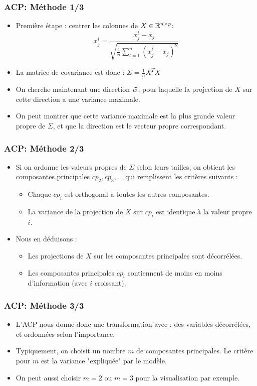 \begin{frame}
\frametitle{ACP: Méthode 1/3}
  \begin{itemize}
  	\item Première étape : centrer les colonnes de $X \in {\mathbb R}^{n \times p}$: 
 \begin{equation*}
 x^i_j = \frac{x_j^i - \overline{x}_j}{\sqrt{\frac{1}{n}\sum_{l=1}^n(x_j^l - \overline{x}_j)^2}} 
 \end{equation*}
 	\item La matrice de covariance est donc : $\Sigma = \frac1n X^TX$ 
 	\item On cherche maintenant une direction $\vec{w}$, pour laquelle la projection de $X$ sur cette direction a une variance maximale. 
 	\item On peut montrer que cette variance maximale est la plus grande valeur propre de $\Sigma$, et que la direction est le vecteur propre correspondant. 
  \end{itemize}
\end{frame}

\begin{frame}
\frametitle{ACP: Méthode 2/3}
  \begin{itemize}
  	\item Si on ordonne les valeurs propres de $\Sigma$ selon leurs tailles, on obtient les composantes principales $cp_2, cp_3, \ldots$ qui remplissent les critères suivants : 
  	\begin{itemize}
  		\item Chaque $cp_i$ est orthogonal à toutes les autres composantes.
  		\item La variance de la projection de $X$ sur $cp_i$ est identique à la valeur propre $i$. 
  	\end{itemize}
  	\item Nous en déduisons : 
  	\begin{itemize}
  		\item Les projections de $X$ sur les composantes principales sont décorrélées. 
  		\item Les composantes principales $cp_i$ contiennent de moins en moins d'information (avec $i$ croissant). 
  	\end{itemize}
  \end{itemize}
\end{frame}

\begin{frame}
\frametitle{ACP: Méthode 3/3}
  \begin{itemize}
  	\item L'ACP nous donne donc une transformation avec : des variables décorrélées, et ordonnées selon l'importance. 
  	\item Typiquement, on choisit un nombre $m$ de composantes principales. Le critère pour $m$ est la variance "expliquée" par le modèle. 
  	\item On peut aussi choisir $m=2$ ou $m=3$ pour la visualisation par exemple.   
  \end{itemize}
\end{frame}

